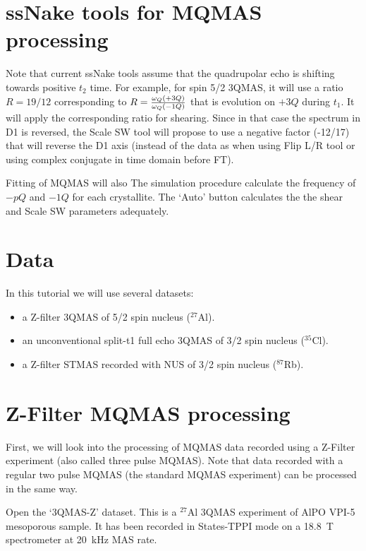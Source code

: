 \documentclass[11pt,a4paper]{article}
\begin{document}
\section{ssNake tools for MQMAS processing}
Note that current ssNake tools assume that the quadrupolar echo is shifting towards 
positive $t_2$ time. For example, for spin 5/2 3QMAS, it will use a ratio $R=19/12$ corresponding to 
$R = {\omega_Q(+3Q) \over \omega_Q(-1Q)}$ that is evolution on $+3Q$ during $t_1$. It will apply the corresponding 
ratio for shearing. Since in that case the spectrum in D1 is reversed, the Scale SW tool will propose to use
a negative factor (-12/17) that will reverse the D1 axis (instead of the data as when using Flip L/R tool or using 
complex conjugate in time domain before FT). 

Fitting of MQMAS will also
The simulation procedure calculate the frequency of $-pQ$ and $-1Q$ for each crystallite. The `Auto' button calculates the 
the shear and Scale SW parameters adequately. 

\section{Data}
In this tutorial we will use several datasets:
\begin{itemize}
\item a Z-filter 3QMAS of 5/2 spin nucleus (${}^{27}$Al).
\item an unconventional split-t1 full echo 3QMAS of 3/2 spin nucleus (${}^{35}$Cl).
\item a Z-filter STMAS recorded with NUS of 3/2 spin nucleus (${}^{87}$Rb).
\end{itemize}


\section{Z-Filter MQMAS processing}
First, we will look into the processing of MQMAS data recorded using a Z-Filter experiment (also called three pulse MQMAS).
Note that data recorded with a regular two pulse MQMAS (the standard MQMAS experiment) can be processed in the same way.

Open the `3QMAS-Z' dataset. This is a ${}^{27}$Al 3QMAS experiment of AlPO VPI-5 mesoporous sample. It has been recorded 
in States-TPPI mode on a 18.8~T spectrometer at 20~kHz MAS rate.
\end{document}
